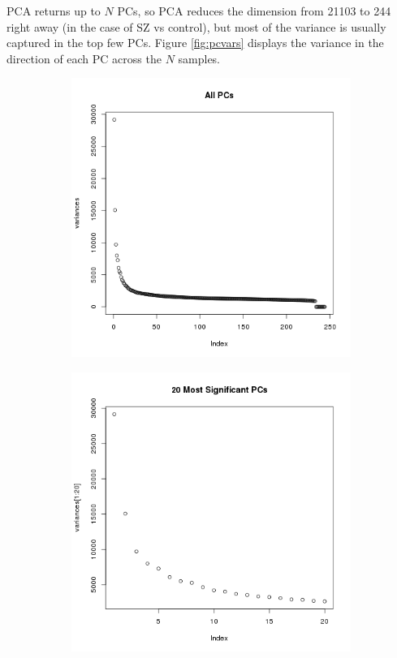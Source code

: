 \documentclass[]{article}
\begin{document}
  PCA returns up to $N$ PCs, so PCA reduces the dimension from 21103 to 244 right away (in the case of SZ vs control), but most of the variance is usually captured in the top few PCs. Figure \ref{fig:pcvars} displays the variance in the direction of each PC across the $N$ samples.

  \begin{figure}[H]
    \centering
    \begin{subfigure}{.49\textwidth}
      \centering
      \includegraphics[width=1\linewidth]{pcs_all.png}
    \end{subfigure}
    \begin{subfigure}{.49\textwidth}
      \centering
      \includegraphics[width=1\linewidth]{pcs_top_20.png}

\end{subfigure}
\end{figure}
\end{document}
